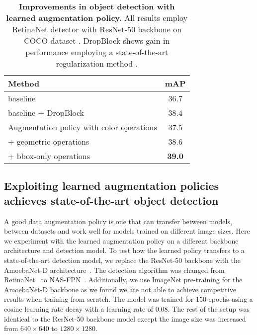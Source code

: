 \documentclass[10pt,twocolumn,letterpaper]{article}
\begin{document}
\begin{table}[t]
\centering
\begin{tabular}{l|c}
\hline
  Method & mAP  \\
  \hline
  baseline & 36.7 \\
  \hline
  baseline + DropBlock~\cite{ghiasi2018dropblock} & 38.4 \\
  \hline 
  Augmentation policy with color operations &  37.5\\
  + geometric operations & 38.6 \\
  + bbox-only operations & \textbf{39.0} \\
  \hline
\end{tabular}
\caption{\textbf{Improvements in object detection with learned augmentation policy.} All results employ RetinaNet detector with ResNet-50 backbone \cite{lin2017focal} on COCO dataset \cite{lin2014microsoft}. DropBlock shows gain in performance employing a state-of-the-art regularization method \cite{ghiasi2018dropblock}.}
\label{tab:search_space}  
\end{table}



\subsection{Exploiting learned augmentation policies achieves state-of-the-art object detection}
A good data augmentation policy is one that can transfer between models, between datasets and work well for models trained on different image sizes. Here we experiment with the learned augmentation policy
on a different backbone architecture and detection model.
To test how the learned policy transfers to a state-of-the-art detection model, we replace the ResNet-50 backbone with the AmoebaNet-D architecture~\cite{real2018regularized}. The detection algorithm was changed from RetinaNet~\cite{lin2017focal} to NAS-FPN~\cite{ghiasi2019NASFpn}. Additionally, we use ImageNet pre-training for the AmoebaNet-D backbone as we found we are not able to achieve competitive results when training from scratch. The model was trained for 150 epochs using a cosine learning rate decay with a learning rate of 0.08. The rest of the setup was identical to the ResNet-50 backbone model except the image size was increased from $640 \times 640$ to $1280 \times 1280$. 
\end{document}

